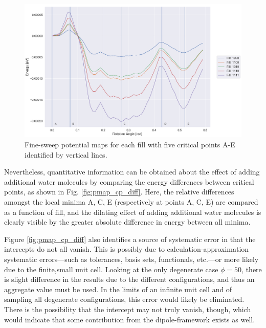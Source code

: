         
         \begin{figure}
             \centering
             \includegraphics[width=0.9\linewidth]{Figures/System/pmap_fine_sweep.png}
             \caption{Fine-sweep potential maps for each fill with five critical points A-E identified by vertical lines.}
             \label{fig:pmap_fine_sweep}
         \end{figure}
         
         Nevertheless, quantitative information can be obtained about the effect of adding additional water molecules by comparing the energy differences between critical points, as shown in Fig. \ref{fig:pmap_cp_diff}. Here, the relative differences amongst the local minima A, C, E (respectively at points A, C, E) are compared as a function of fill, and the dilating effect of adding additional water molecules is clearly visible by the greater absolute difference in energy between all minima. 
         
         Figure \ref{fig:pmap_cp_diff} also identifies a source of systematic error in that the intercepts do not all vanish. This is possibly due to calculation-approximation systematic errors---such as tolerances, basis sets, functionals, etc.---or more likely due to the finite,small unit cell. Looking at the only degenerate case $\phi=50$, there is slight difference in the results due to the different configurations, and thus an aggregate value must be used. In the limits of an infinite unit cell and of sampling all degenerate configurations, this error would likely be eliminated. There is the possibility that the intercept may not truly vanish, though, which would indicate that some contribution from the dipole-framework exists as well.
         
